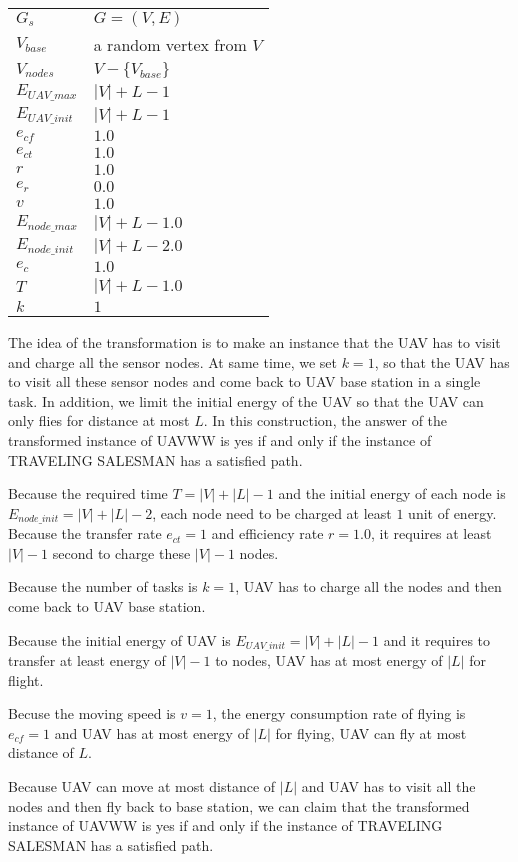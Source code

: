 \documentclass[11pt]{article}
\begin{document}
\begin{tabular}{| l | l |}
\hline
$G_s$ & $G = (V, E)$ \\
$V_{base}$ & a random vertex from $V$ \\
$V_{nodes}$ & $V - \{V_{base}\}$ \\
$E_{UAV\_max}$ & $|V| + L - 1$ \\
$E_{UAV\_init}$ & $|V| + L - 1$ \\
$e_{cf}$ & $1.0$ \\
$e_{ct}$ & $1.0$ \\
$r$ & $1.0$ \\
$e_r$ & $0.0$ \\
$v$ & $1.0$ \\
$E_{node\_max}$ & $|V| + L - 1.0$ \\
$E_{node\_init}$ & $|V| + L - 2.0$ \\
$e_{c}$ & $1.0$ \\
$T$ & $|V| + L - 1.0$ \\
$k $ & $1$ \\
\hline
\end{tabular}

The idea of the transformation is to make an instance that the UAV has to visit and charge all the sensor nodes. At same time, we set $k = 1$, so that the UAV has to visit all these sensor nodes and come back to UAV base station in a single task. In addition, we limit the initial energy of the UAV so that the UAV can only flies for distance at most $L$. In this construction, the answer of the transformed instance of UAVWW is yes if and only if the instance of TRAVELING SALESMAN has a satisfied path.

Because the required time $T = |V| + |L| - 1$ and the initial energy of each node is $E_{node\_init} = |V| + |L| - 2$, each node need to be charged at least $1$ unit of energy. Because the transfer rate $e_{ct} = 1$ and efficiency rate $r = 1.0$, it requires at least $|V| - 1$ second to charge these $|V| - 1$ nodes.

Because the number of tasks is $k = 1$, UAV has to charge all the nodes and then come back to UAV base station.

Because the initial energy of UAV is $E_{UAV\_init} = |V| + |L| - 1$ and it requires to transfer at least energy of $|V| - 1$ to nodes, UAV has at most energy of $|L|$ for flight. 

Becuse the moving speed is $v = 1$, the energy consumption rate of flying is  $e_{cf} = 1$ and UAV has at most energy of $|L|$ for flying, UAV can fly at most distance of $L$.

Because UAV can move at most distance of $|L|$ and UAV has to visit all the nodes and then fly back to base station, we can claim that the transformed instance of UAVWW is yes if and only if the instance of TRAVELING SALESMAN has a satisfied path.
\end{document}
